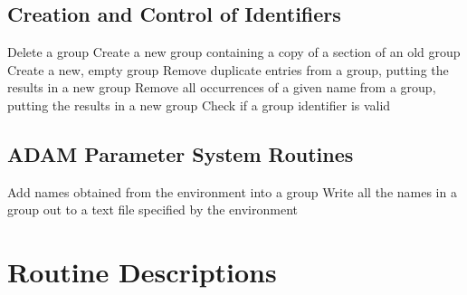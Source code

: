 \subsection{Creation and Control of Identifiers}

            {Delete a group}
            {Create a new group containing a copy of a section of an old group}
            {Create a new, empty group}
            {Remove duplicate entries from a group, putting the results in a new
group}
            {Remove all occurrences of a given name from a group, putting the results in a new group}
            {Check if a group identifier is valid}

\subsection{\label{SEC:ADAM}ADAM Parameter System Routines}


            {Add names obtained from the environment into a group}
            {Write all the names in a group out to a text file specified by the
environment}


\newpage
\section{\label{APP:SPEC}Routine Descriptions}







